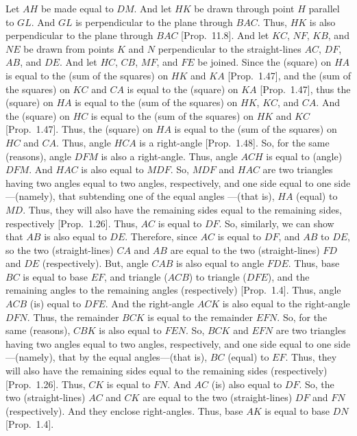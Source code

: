 \begin{Parallel}{}{}
{Let $AH$ be made equal to $DM$. And let $HK$ be drawn through
point $H$ parallel to $GL$. And $GL$  is perpendicular to the plane
through $BAC$. Thus, $HK$  is also perpendicular to the plane through
$BAC$ [Prop.~11.8]. And let  $KC$, $NF$, $KB$, and $NE$ 
be drawn from points $K$ and $N$ perpendicular to the straight-lines $AC$, $DF$,
$AB$, and $DE$. And let $HC$, $CB$, $MF$, and $FE$ 
be joined. Since the (square) on $HA$ is equal to the (sum of the squares)
on $HK$ and $KA$ [Prop.~1.47], 
and the (sum of the squares) on $KC$ and $CA$ is equal to the (square) on $KA$   [Prop.~1.47], thus the  (square) on $HA$ is equal to the (sum
of the squares) on $HK$, $KC$, and $CA$. And the (square) on $HC$ is equal to the (sum of
the squares) on $HK$ and $KC$  [Prop.~1.47].
Thus, the (square) on $HA$ is equal to the (sum of the squares) on $HC$ and
$CA$. Thus, angle $HCA$ is a right-angle [Prop.~1.48]. So, for the same (reasons), angle $DFM$ is also
a right-angle. Thus, angle $ACH$ is equal to (angle) $DFM$. And $HAC$
is also equal to $MDF$.  So, $MDF$ and $HAC$
are two triangles
having two angles equal to two angles, respectively, and one side
equal to one side---(namely), that subtending one of the equal angles ---(that is), $HA$ (equal) to $MD$. 
Thus, they will also have the remaining sides equal to the remaining sides, respectively [Prop.~1.26]. Thus, $AC$ is equal to $DF$. So, similarly, we can show that $AB$ is also equal to $DE$. 
Therefore, since $AC$ is equal to $DF$, and $AB$ to $DE$, so the two
(straight-lines) $CA$ and $AB$ are equal to the two (straight-lines)
$FD$ and $DE$ (respectively). But, angle
$CAB$ is also equal to angle $FDE$. Thus, base $BC$ is equal to base
$EF$, and triangle ($ACB$) to triangle ($DFE$), and the remaining angles
to the remaining angles (respectively) [Prop.~1.4].
Thus, angle  $ACB$ (is) equal to $DFE$. And the right-angle $ACK$
is also equal to the right-angle $DFN$. Thus, the remainder
$BCK$ is equal to the remainder $EFN$. So, for the same (reasons), 
$CBK$ is also equal to $FEN$. So, $BCK$ and $EFN$
are two triangles having two angles equal to two angles, respectively, 
and one side equal to one side---(namely), that by the equal angles---(that is), $BC$ (equal) to $EF$. Thus, they will also have the remaining
sides equal to the remaining sides (respectively) [Prop.~1.26]. Thus, $CK$ is equal to $FN$. And $AC$ (is) also
equal to $DF$. So, the two (straight-lines) $AC$ and $CK$
are equal to the two (straight-lines) $DF$ and $FN$ (respectively). 
And they enclose right-angles. Thus, base $AK$ is equal to base $DN$
[Prop.~1.4]. 
}
\end{Parallel}

